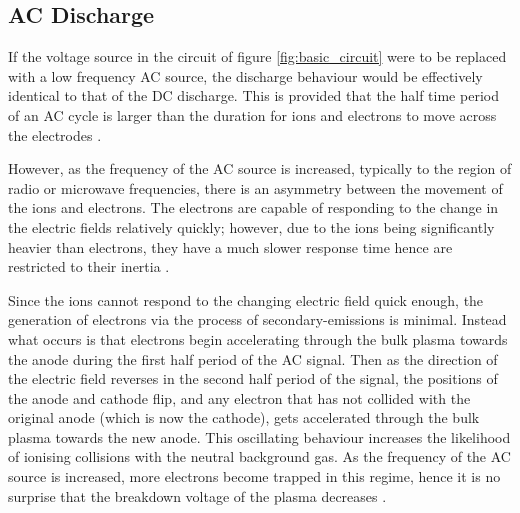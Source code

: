 \subsection{AC Discharge}

If the voltage source in the circuit of figure \ref{fig:basic_circuit} were to be replaced with a low frequency AC source, the discharge behaviour would be effectively identical to that of the DC discharge. This is provided that the half time period of an AC cycle is larger than the duration for ions and electrons to move across the electrodes \cite{Bogaerts2002}.

However, as the frequency of the AC source is increased, typically to the region of radio or microwave frequencies, there is an asymmetry between the movement of the ions and electrons. The electrons are capable of responding to the change in the electric fields relatively quickly; however, due to the ions being significantly heavier than electrons, they have a much slower response time hence are restricted to their inertia \cite{Chabert2011}.

Since the ions cannot respond to the changing electric field quick enough, the generation of electrons via the process of secondary-emissions is minimal. Instead what occurs is that electrons begin accelerating through the bulk plasma towards the anode during the first half period of the AC signal. Then as the direction of the electric field reverses in the second half period of the signal, the positions of the anode and cathode flip, and any electron that has not collided with the original anode (which is now the cathode), gets accelerated through the bulk plasma towards the new anode. This oscillating behaviour increases the likelihood of ionising collisions with the neutral background gas. As the frequency of the AC source is increased, more electrons become trapped in this regime, hence it is no surprise that the breakdown voltage of the plasma decreases \cite{Chu1992}.

